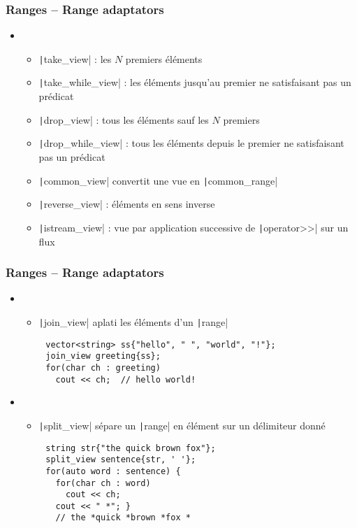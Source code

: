 \documentclass[C++.tex]{subfiles}
\begin{document}
\begin{frame}[fragile]
	\frametitle{Ranges -- Range adaptators}
	\begin{itemize}
		\item  [] \begin{itemize}
			\item \texttt|take_view| : les $N$ premiers éléments
			\item \texttt|take_while_view| : les éléments jusqu'au premier ne satisfaisant pas un prédicat
			\item \texttt|drop_view| : tous les éléments sauf les $N$ premiers
			\item \texttt|drop_while_view| : tous les éléments depuis le premier ne satisfaisant pas un prédicat
			\item \texttt|common_view| convertit une vue en \texttt|common_range|
			\item \texttt|reverse_view| : éléments en sens inverse
			\item \texttt|istream_view| : vue par application successive de \texttt|operator>>| sur un flux
		\end{itemize}
	\end{itemize}
\end{frame}

\begin{frame}[fragile]
	\frametitle{Ranges -- Range adaptators}
	\begin{itemize}
		\item  [] \begin{itemize}
			\item \texttt|join_view| \og aplati\fg{} les éléments d'un \texttt|range|
		\end{itemize}
	\end{itemize}

	\begin{verbatim}
		vector<string> ss{"hello", " ", "world", "!"};
		join_view greeting{ss};
		for(char ch : greeting)
		  cout << ch;  // hello world!
  	\end{verbatim}

	\begin{itemize}
		\item  [] \begin{itemize}
			\item \texttt|split_view| sépare un \texttt|range| en élément sur un délimiteur donné
		\end{itemize}
	\end{itemize}

	\begin{verbatim}
		string str{"the quick brown fox"};
		split_view sentence{str, ' '};
		for(auto word : sentence) {
		  for(char ch : word)
		    cout << ch;
		  cout << " *"; }
		  // the *quick *brown *fox *
  	\end{verbatim}
\end{frame}
\end{document}
